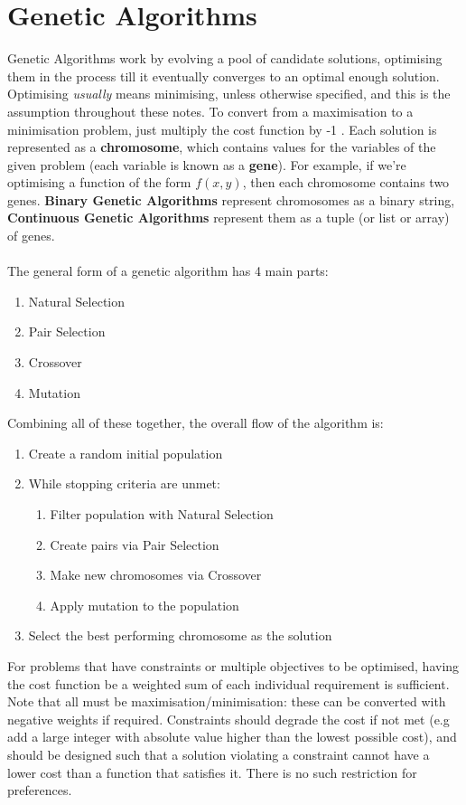 \section{Genetic Algorithms}

Genetic Algorithms work by evolving a pool of candidate solutions, optimising them in the process till it eventually converges to an optimal enough solution. Optimising \textit{usually} means minimising, unless otherwise specified, and this is the assumption throughout these notes. To convert from a maximisation to a minimisation problem, just multiply the cost function by -1 .
Each solution is represented as a \textbf{chromosome}, which contains values for the variables of the given problem (each variable is known as a \textbf{gene}). For example, if we're optimising a function of the form \( f(x,y) \), then each chromosome contains two genes. \textbf{Binary Genetic Algorithms} represent chromosomes as a binary string, \textbf{Continuous Genetic Algorithms} represent them as a tuple (or list or array) of genes.
\\ \\
The general form of a genetic algorithm has 4 main parts:
\begin{enumerate}
    \item Natural Selection
    \item Pair Selection
    \item Crossover
    \item Mutation\\ 
\end{enumerate}
Combining all of these together, the overall flow of the algorithm is: 
\begin{enumerate}[label=\Alph*]
\item Create a random initial population
\item While stopping criteria are unmet:
\begin{enumerate}[label=\arabic*]
    \item Filter population with Natural Selection
    \item Create pairs via Pair Selection
    \item Make new chromosomes via Crossover
    \item Apply mutation to the population
\end{enumerate}
\item Select the best performing chromosome as the solution\\
\end{enumerate}
For problems that have constraints or multiple objectives to be optimised, having the cost function be a weighted sum of each individual requirement is sufficient. Note that all must be maximisation/minimisation: these can be converted with negative weights if required. Constraints should degrade the cost if not met (e.g add a large integer with absolute value higher than the lowest possible cost), and should be designed such that a solution violating a constraint cannot have a lower cost than a function that satisfies it. There is no such restriction for preferences. 